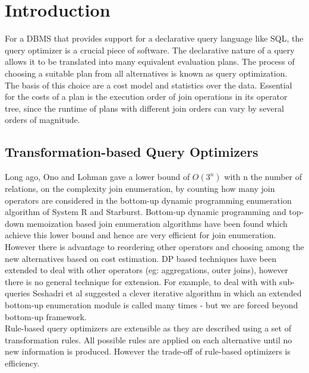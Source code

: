 \chapter{Introduction}

For a DBMS that provides support for a declarative query
language like SQL, the query optimizer is a crucial piece of software. The declarative nature of a query allows it to be translated into many equivalent evaluation plans. The process of choosing a suitable plan from all alternatives is known as query optimization. The basis of this choice are a cost model and statistics over the data. Essential for the costs of a plan is the execution order of join operations in its operator tree, since the runtime of plans with different join orders can vary by several orders of magnitude. 

\section{Transformation-based Query Optimizers}
Long ago, Ono and Lohman\cite{ono1990measuring} gave a lower bound of $O(3^n)$ with n the number of relations, on the complexity join enumeration, by counting how many join operators are considered in the bottom-up dynamic programming enumeration algorithm of System R and Starburst. Bottom-up dynamic programming and top-down memoization based join enumeration algorithms have been found which achieve this lower bound and hence are very efficient for join enumeration. However there is advantage to reordering other operators and choosing among the new alternatives based on cost estimation. DP based techniques have been extended to deal with other operators (eg: aggregations, outer joins), however there is no general technique for extension. For example, to deal with with sub-queries Seshadri et al suggested a clever iterative algorithm in which an extended bottom-up enumeration module is called many times - but we are forced beyond bottom-up framework. \\

Rule-based query optimizers are extensible as they are described using a set of transformation rules. All possible rules are applied on each alternative until no new information is produced. However the trade-off of rule-based optimizers is efficiency.

